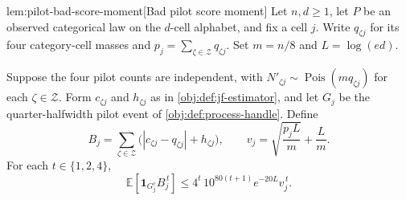\documentclass[11pt]{article}
\begin{document}
\begin{lemmav}{lem:pilot-bad-score-moment}[Bad pilot score moment]
Let \(n,d\geq 1\), let \(P\) be an observed categorical law on the \(d\)-cell alphabet, and fix a cell \(j\). Write \(q_{\zeta j}\) for its four category-cell masses and \(p_j=\sum_{\zeta\in\mathcal Z}q_{\zeta j}\). Set \(m=n/8\) and \(L=\log(ed)\).

Suppose the four pilot counts are independent, with \(N'_{\zeta j}\sim\operatorname{Pois}(mq_{\zeta j})\) for each \(\zeta\in\mathcal Z\). Form \(c_{\zeta j}\) and \(h_{\zeta j}\) as in \cref{obj:def:jf-estimator}, and let \(G_j\) be the quarter-halfwidth pilot event of \cref{obj:def:process-handle}. Define
\[
B_j=\sum_{\zeta\in\mathcal Z}\bigl(|c_{\zeta j}-q_{\zeta j}|+h_{\zeta j}\bigr),
\qquad
v_j=\sqrt{\frac{p_jL}{m}}+\frac{L}{m}.
\]
For each \(t\in\{1,2,4\}\),
\[
\mathbb E\!\left[\mathbf 1_{G_j^c}B_j^{\,t}\right]
\leq
4^t\,10^{80(t+1)}e^{-20L}v_j^{\,t}.
\]
\end{lemmav}
\end{document}
